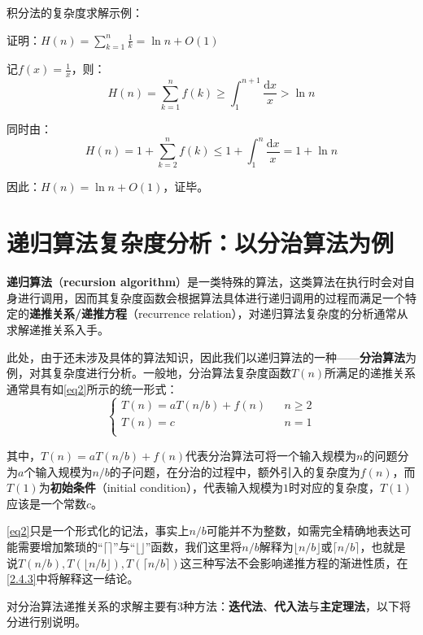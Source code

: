 \documentclass[12pt,a4paper,violet]{bbe}
\begin{document}
积分法的复杂度求解示例：
\begin{example}
	证明：$H(n)=\sum\limits_{k=1}^n\frac{1}{k}=\ln n+O(1)$
\end{example}
\begin{solution}
记$f(x)=\frac{1}{x}$，则：
$$
H(n)=\sum\limits_{k=1}^nf(k)\geqslant\int_{1}^{n+1}\frac{\mathrm{d}x}{x}>\ln n
$$

同时由：
$$
H(n)=1+\sum\limits_{k=2}^nf(k)\leqslant1+\int_{1}^{n}\frac{\mathrm{d}x}{x}=1+\ln n
$$

因此：$H(n)=\ln n+O(1)$，证毕。
\end{solution}
\section{递归算法复杂度分析：以分治算法为例}
\textbf{递归算法}（\textbf{recursion algorithm}）是一类特殊的算法，这类算法在执行时会对自身进行调用，因而其复杂度函数会根据算法具体进行递归调用的过程而满足一个特定的\textbf{递推关系/递推方程}（recurrence relation），对递归算法复杂度的分析通常从求解递推关系入手。

此处，由于还未涉及具体的算法知识，因此我们以递归算法的一种——\textbf{分治算法}为例，对其复杂度进行分析。一般地，分治算法复杂度函数$T(n)$所满足的递推关系通常具有如\cref{eq2}所示的统一形式：
\begin{equation}
\left\{
	\begin{array}{lcc}
	T(n)=aT(n/b)+f(n)&&n\geqslant2\\
	T(n)=c&&n=1\\
	\end{array}\right.
\label{eq2}
\end{equation}

其中，$T(n)=aT(n/b)+f(n)$代表分治算法可将一个输入规模为$n$的问题分为$a$个输入规模为$n/b$的子问题，在分治的过程中，额外引入的复杂度为$f(n)$，而$T(1)$为\textbf{初始条件}（initial condition），代表输入规模为$1$时对应的复杂度，$T(1)$应该是一个常数$c$。
\begin{remark}
	\cref{eq2}只是一个形式化的记法，事实上$n/b$可能并不为整数，如需完全精确地表达可能需要增加繁琐的“$\lceil\rceil$”与“$\lfloor\rfloor$”函数，我们这里将$n/b$解释为$\lfloor n/b\rfloor$或$\lceil n/b\rceil$，也就是说$T(n/b),T(\lfloor n/b\rfloor),T(\lceil n/b\rceil)$这三种写法不会影响递推方程的渐进性质，在\cref{2.4.3}中将解释这一结论。
\end{remark}

对分治算法递推关系的求解主要有3种方法：\textbf{迭代法}、\textbf{代入法}与\textbf{主定理法}，以下将分进行别说明。
\end{document}
